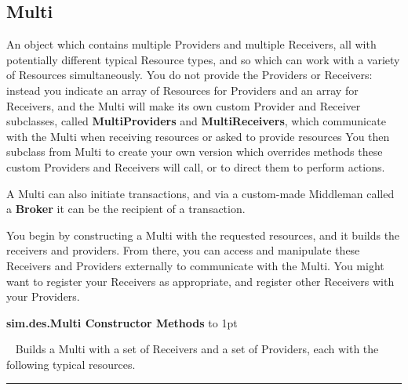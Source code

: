 \documentclass[twoside,10pt]{article}
\newcommand\class[1]{\index{Classes!{#1}}\textsf{#1}}
\newcommand*{\xfill}[1][0pt]{%
	\cleaders
		\hbox to 1pt{\hss
			\raisebox{#1}{\rule{1.2pt}{0.4pt}}%
			\hss}\hfill}
\newenvironment{methods}[1]{
\vspace{1.0em}\noindent\textsf{\textbf{#1 Methods}}\quad \xfill[0.5ex]
\vspace{-0.25em}
\begin{description}
\small}
{\end{description}\hrule\vspace{1.5em}}
\newcommand{\mthd}[1]{\item[{\sf #1}]~\newline}
\begin{document}
\subsection{Multi}

An object which contains multiple Providers and multiple Receivers, all with potentially different typical Resource types, and so which can work with a variety of Resources simultaneously.    You do not provide the Providers or Receivers: instead you indicate an array of Resources for Providers and an array for Receivers, and the Multi will make its own custom Provider and Receiver subclasses, called {\bf MultiProviders} and {\bf MultiReceivers}, which communicate with the Multi when receiving resources or asked to provide resources  You then subclass from Multi to create your own version which overrides methods these custom Providers and Receivers will call, or to direct them to perform actions.

A Multi can also initiate transactions, and via a custom-made Middleman called a {\bf Broker} it can be the recipient of a transaction.

You begin by constructing a Multi with the requested resources, and it builds the receivers and providers.  From there, you can access and manipulate these Receivers and Providers externally to communicate with the Multi.  You might want to register your Receivers as appropriate, and register other Receivers with your Providers.

\begin{methods}{\class{sim.des.Multi} Constructor}
\mthd{public Multi(SimState state, Resource[] receiverResources, Resource[] providerResources)}
Builds a Multi with a set of Receivers and a set of Providers, each with the following typical resources.
 \end{methods}
\end{document}
